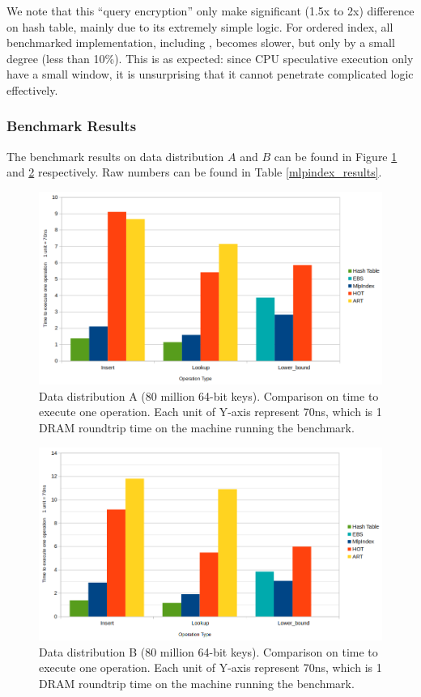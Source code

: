 \documentclass[11pt, usletter]{article}
\begin{document}
We note that this ``query encryption'' only make significant (1.5x to 2x) difference on hash table, mainly due to its extremely simple logic. 
For ordered index, all benchmarked implementation, including \MlpIndex, becomes slower, but only by a small degree (less than 10\%). 
This is as expected: since CPU speculative execution only have a small window, it is unsurprising that it 
cannot penetrate complicated logic effectively. 

\subsubsection*{Benchmark Results}

The benchmark results on data distribution $A$ and $B$ can be found in Figure \ref{mlpindex_distA} and \ref{mlpindex_distB} respectively.
Raw numbers can be found in Table \ref{mlpindex_results}.

\begin{figure}[!htb]
\centering
  \includegraphics[width=0.8\linewidth]{mlpindex_result1.png}
\caption{Data distribution A (80 million 64-bit keys). Comparison on time to execute one operation. 
Each unit of Y-axis represent 70ns, which is 1 DRAM roundtrip time on the machine running the benchmark.}
\label{mlpindex_distA}
\end{figure}

\begin{figure}[!htb]
\centering
  \includegraphics[width=0.8\linewidth]{mlpindex_result2.png}
\caption{Data distribution B (80 million 64-bit keys). Comparison on time to execute one operation. 
Each unit of Y-axis represent 70ns, which is 1 DRAM roundtrip time on the machine running the benchmark.}
\label{mlpindex_distB}
\end{figure}
\end{document}
